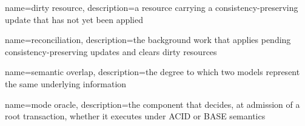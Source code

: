 

{
  name=dirty resource,
  description={a resource carrying a consistency-preserving update that
               has not yet been applied}
}

{
  name=reconciliation,
  description={the background work that applies pending
               consistency-preserving updates and clears dirty resources}
}

{
  name=semantic overlap,
  description={the degree to which two models represent the same
               underlying information}
}

{
  name=mode oracle,
  description={the component that decides, at admission of a root
               transaction, whether it executes under ACID or BASE
               semantics}
}
